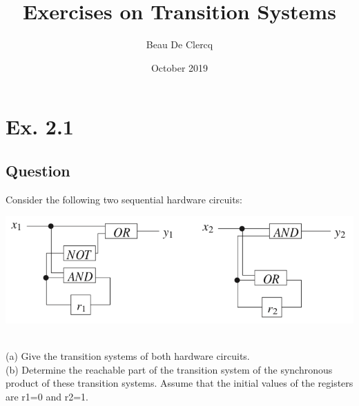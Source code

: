 \documentclass[12pt]{article}
\title{Exercises on Transition Systems}
\author{Beau De Clercq}
\date{October 2019}
\begin{document}
\maketitle{}


\clearpage
\newpage

\section*{Ex. 2.1}
\subsection*{Question}
Consider the following two sequential hardware circuits:\\
\begin{centering}
	\includegraphics*[width=\linewidth]{circuits.png}
\end{centering}
\\
(a) Give the transition systems of both hardware circuits.\\
(b) Determine the reachable part of the transition system of the synchronous product of these
transition systems. Assume that the initial values of the registers are r1=0 and r2=1.
\end{document}

